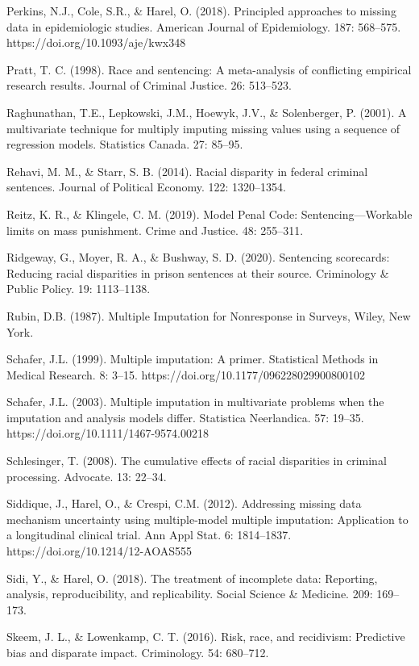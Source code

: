\documentclass[titlepage]{article}
\begin{document}
Perkins, N.J., Cole, S.R., \& Harel, O. (2018). Principled approaches to missing data in epidemiologic studies. American Journal of Epidemiology. 187: 568--575. https://doi.org/10.1093/aje/kwx348

Pratt, T. C. (1998). Race and sentencing: A meta-analysis of conflicting empirical research results. Journal of Criminal Justice. 26: 513--523.

Raghunathan, T.E., Lepkowski, J.M., Hoewyk, J.V., \& Solenberger, P. (2001). A multivariate technique for multiply imputing missing values using a sequence of regression models. Statistics Canada. 27: 85--95.

Rehavi, M. M., \& Starr, S. B. (2014). Racial disparity in federal criminal sentences. Journal of Political Economy. 122: 1320--1354.

Reitz, K. R., \& Klingele, C. M. (2019). Model Penal Code: Sentencing—Workable limits on mass punishment. Crime and Justice. 48: 255--311.

Ridgeway, G., Moyer, R. A., \& Bushway, S. D. (2020). Sentencing scorecards: Reducing racial disparities in prison sentences at their source. Criminology \& Public Policy. 19: 1113--1138.

Rubin, D.B. (1987). Multiple Imputation for Nonresponse in Surveys, Wiley, New York.

Schafer, J.L. (1999). Multiple imputation: A primer. Statistical Methods in Medical Research. 8: 3--15. https://doi.org/10.1177/096228029900800102

Schafer, J.L. (2003). Multiple imputation in multivariate problems when the imputation and analysis models differ. Statistica Neerlandica. 57: 19--35. https://doi.org/10.1111/1467-9574.00218

Schlesinger, T. (2008). The cumulative effects of racial disparities in criminal processing. Advocate. 13: 22--34.

Siddique, J., Harel, O., \& Crespi, C.M. (2012). Addressing missing data mechanism uncertainty using multiple-model multiple imputation: Application to a longitudinal clinical trial. Ann Appl Stat. 6: 1814–1837. https://doi.org/10.1214/12-AOAS555 

Sidi, Y., \& Harel, O. (2018). The treatment of incomplete data: Reporting, analysis, reproducibility, and replicability. Social Science \& Medicine. 209: 169--173.

Skeem, J. L., \& Lowenkamp, C. T. (2016). Risk, race, and recidivism: Predictive bias and disparate impact. Criminology. 54: 680--712.
\end{document}
